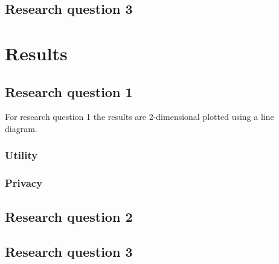 \subsection{Research question 3}
\section{Results}
\subsection{Research question 1}
For research question 1 the results are 2-dimensional plotted using a line diagram.
\subsubsection{Utility}
\subsubsection{Privacy}

\subsection{Research question 2}
\subsection{Research question 3}